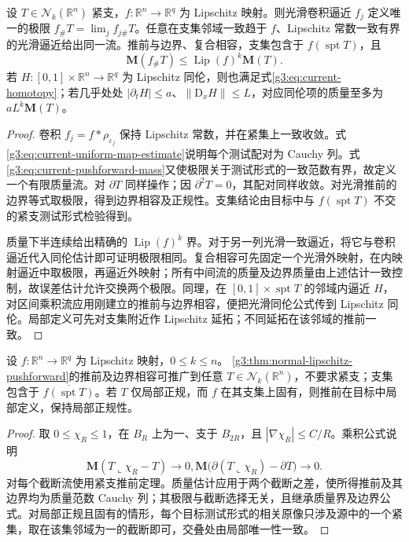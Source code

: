 \begin{theorem}\label{g3:thm:normal-lipschitz-pushforward}
	设 \(T\in\mathcal N_k(\mathbb R^n)\) 紧支，\(f:\mathbb R^n\to\mathbb R^q\) 为 Lipschitz 映射。则光滑卷积逼近 \(f_j\) 定义唯一的极限 \(f_\#T=\lim_jf_{j\#}T\)。任意在支集邻域一致趋于 \(f\)、Lipschitz 常数一致有界的光滑逼近给出同一流。推前与边界、复合相容，支集包含于 \(f(\operatorname{spt}T)\)，且
	\[
		\mathbf M(f_\#T)\le\operatorname{Lip}(f)^k\mathbf M(T).
	\]
	若 \(H:[0,1]\times\mathbb R^n\to\mathbb R^q\) 为 Lipschitz 同伦，则也满足式\eqref{g3:eq:current-homotopy}；若几乎处处 \(|\partial_tH|\le a\)、\(\|\mathrm D_xH\|\le L\)，对应同伦项的质量至多为 \(aL^k\mathbf M(T)\)。
\end{theorem}
\begin{proof}
	卷积 \(f_j=f*\rho_{\varepsilon_j}\) 保持 Lipschitz 常数，并在紧集上一致收敛。式\eqref{g3:eq:current-uniform-map-estimate}说明每个测试配对为 Cauchy 列。式\eqref{g3:eq:current-pushforward-mass}又使极限关于测试形式的一致范数有界，故定义一个有限质量流。对 \(\partial T\) 同样操作；因 \(\partial^2T=0\)，其配对同样收敛。对光滑推前的边界等式取极限，得到边界相容及正规性。支集结论由目标中与 \(f(\operatorname{spt}T)\) 不交的紧支测试形式检验得到。

	质量下半连续给出精确的 \(\operatorname{Lip}(f)^k\) 界。对于另一列光滑一致逼近，将它与卷积逼近代入同伦估计即可证明极限相同。复合相容可先固定一个光滑外映射，在内映射逼近中取极限，再逼近外映射；所有中间流的质量及边界质量由上述估计一致控制，故误差估计允许交换两个极限。同理，在 \([0,1]\times\operatorname{spt}T\) 的邻域内逼近 \(H\)，对区间乘积流应用刚建立的推前与边界相容，便把光滑同伦公式传到 Lipschitz 同伦。局部定义可先对支集附近作 Lipschitz 延拓；不同延拓在该邻域的推前一致。
\end{proof}

\begin{corollary}\label{g3:cor:normal-pushforward-finite}
	设 \(f:\mathbb R^n\to\mathbb R^q\) 为 Lipschitz 映射，\(0\le k\le n\)。
	\cref{g3:thm:normal-lipschitz-pushforward}的推前及边界相容可推广到任意 \(T\in\mathcal N_k(\mathbb R^n)\)，不要求紧支；支集包含于 \(\overline{f(\operatorname{spt}T)}\)。若 \(T\) 仅局部正规，而 \(f\) 在其支集上固有，则推前在目标中局部定义，保持局部正规性。
\end{corollary}
\begin{proof}
	取 \(0\le\chi_R\le1\)，在 \(B_R\) 上为一、支于 \(B_{2R}\)，且 \(|\nabla\chi_R|\le C/R\)。乘积公式说明
	\[
		\mathbf M(T\llcorner\chi_R-T)\to0,
		\mathbf M\bigl(\partial(T\llcorner\chi_R)-\partial T\bigr)\to0.
	\]
	对每个截断流使用紧支推前定理。质量估计应用于两个截断之差，使所得推前及其边界均为质量范数 Cauchy 列；其极限与截断选择无关，且继承质量界及边界公式。对局部正规且固有的情形，每个目标测试形式的相关原像只涉及源中的一个紧集，取在该集邻域为一的截断即可，交叠处由局部唯一性一致。
\end{proof}

